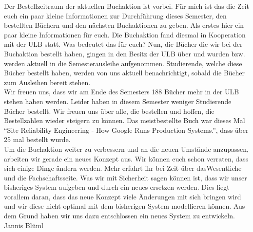 {Der Bestellzeitraum der aktuellen Buchaktion ist vorbei. Für mich ist das die Zeit euch ein paar kleine Informationen zur Durchführung dieses Semester, den bestellten Büchern und den nächsten Buchaktionen zu geben.}
{
Als erstes hier ein paar kleine Informationen für euch. Die Buchaktion fand
diesmal in Kooperation mit der ULB statt. Was bedeutet das für euch? Nun, die
Bücher die wir bei der Buchaktion bestellt haben, gingen in den Besitz der ULB
über und wurden bzw. werden aktuell in die Semesterausleihe aufgenommen.
Studierende, welche diese Bücher bestellt haben, werden von uns  aktuell benachrichtigt, sobald die Bücher zum Ausleihen bereit stehen. \\

Wir freuen uns, dass wir am Ende des Semesters 188 Bücher mehr in der ULB
stehen haben werden. Leider haben in diesem Semester weniger Studierende Bücher
bestellt. Wir freuen uns über alle, die bestellen und hoffen, die
Bestellzahlen wieder steigern zu können. Das meistbestellte Buch war dieses Mal
\enquote{Site Reliability Engineering -  How Google Runs Production Systems.}, dass über 25 mal bestellt wurde. \\

Um die Buchaktion weiter zu verbessern und an die neuen Umstände anzupassen, arbeiten wir gerade ein neues Konzept aus.
Wir können euch schon verraten, dass sich einige Dinge ändern werden. Mehr erfahrt ihr bei Zeit über dasWesentliche und die Fachschaftsseite. Was wir mit Sicherheit sagen können ist, dass wir unser bisheriges System aufgeben und durch ein neues ersetzen werden. Dies liegt vorallem daran, dass das neue Konzept viele Änderungen mit sich bringen wird und wir diese nicht optimal mit dem bisherigen System modellieren können. Aus dem Grund haben wir uns dazu entschlossen ein neues System zu entwickeln.
}
{Jannis Blüml}
